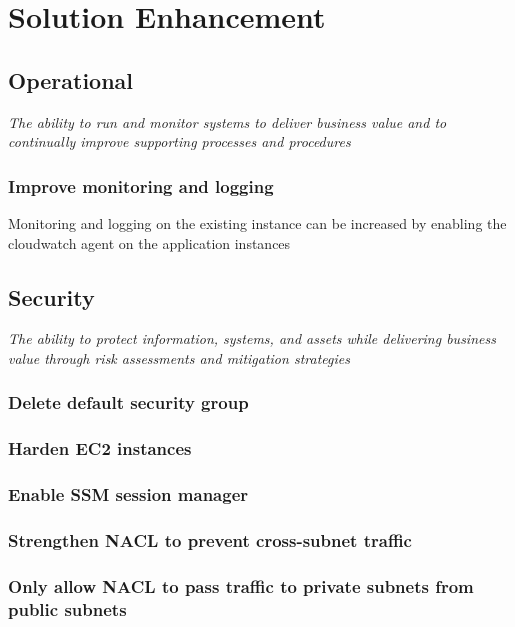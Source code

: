 \section{Solution Enhancement}

\subsection{Operational}

\textit{The ability to run and monitor systems to deliver business value and to continually improve supporting processes and procedures}

\subsubsection{Improve monitoring and logging}

Monitoring and logging on the existing instance can be increased by enabling the cloudwatch agent on the application instances


\subsection{Security}

\textit{The ability to protect information, systems, and assets while delivering business value through risk assessments and mitigation strategies}

\subsubsection{Delete default security group}
\subsubsection{Harden EC2 instances}

\subsubsection{Enable SSM session manager}

\subsubsection{Strengthen NACL to prevent cross-subnet traffic}

\subsubsection{Only allow NACL to pass traffic to private subnets from public subnets}

